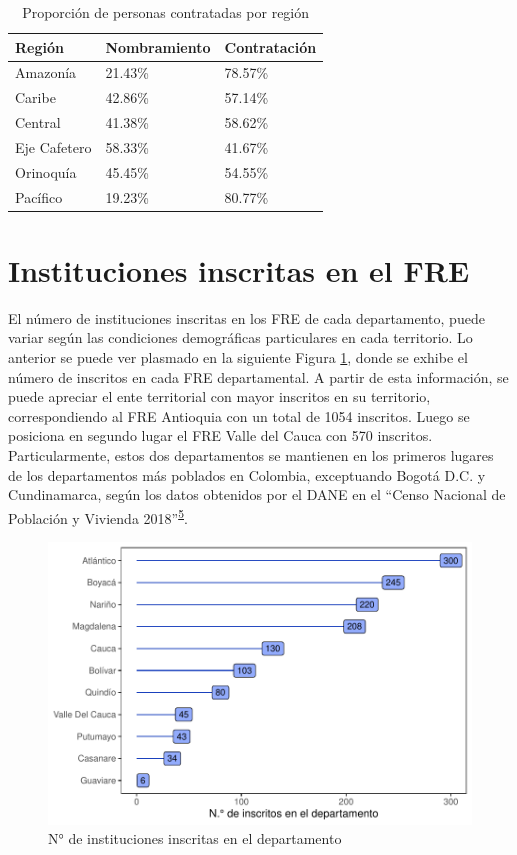 \documentclass[
]{book}
\begin{document}
\begin{table}

\caption{\label{tab:CaracterizacionIngreso1}Proporción de personas contratadas por región}
\centering
\begin{tabular}[t]{lll}
\toprule
Región & Nombramiento & Contratación\\
\midrule
Amazonía & 21.43\% & 78.57\%\\
Caribe & 42.86\% & 57.14\%\\
Central & 41.38\% & 58.62\%\\
Eje Cafetero & 58.33\% & 41.67\%\\
Orinoquía & 45.45\% & 54.55\%\\
\addlinespace
Pacífico & 19.23\% & 80.77\%\\
\bottomrule
\end{tabular}
\end{table}

\hypertarget{instituciones-inscritas-en-el-fre}{%
\section{Instituciones inscritas en el FRE}\label{instituciones-inscritas-en-el-fre}}

El número de instituciones inscritas en los FRE de cada departamento, puede variar según las condiciones demográficas particulares en cada territorio. Lo anterior se puede ver plasmado en la siguiente Figura \ref{fig:institucionesInscritas}, donde se exhibe el número de inscritos en cada FRE departamental. A partir de esta información, se puede apreciar el ente territorial con mayor inscritos en su territorio, correspondiendo al FRE Antioquia con un total de 1054 inscritos. Luego se posiciona en segundo lugar el FRE Valle del Cauca con 570 inscritos. Particularmente, estos dos departamentos se mantienen en los primeros lugares de los departamentos más poblados en Colombia, exceptuando Bogotá D.C. y Cundinamarca, según los datos obtenidos por el DANE en el ``Censo Nacional de Población y Vivienda 2018''\textsuperscript{\protect\hyperlink{ref-DANE2021}{5}}.

\begin{figure}
\includegraphics[width=0.9\linewidth]{InformeFinal_files/figure-latex/institucionesInscritas-1} \caption{N° de instituciones inscritas en el departamento}\label{fig:institucionesInscritas}
\end{figure}
\end{document}
